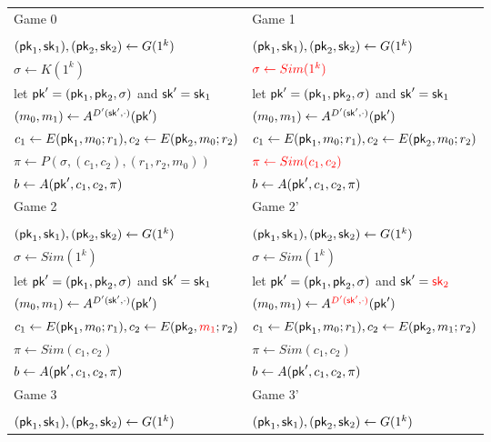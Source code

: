 \begin{table}[t!]
\centering
\begin{tabular}{l|l}
Game 0 &
Game 1 \\
 & \\
$(\mathsf{pk}_1,\mathsf{sk}_1),(\mathsf{pk}_2,\mathsf{sk}_2) \leftarrow G(1^k)$ &
$(\mathsf{pk}_1,\mathsf{sk}_1),(\mathsf{pk}_2,\mathsf{sk}_2) \leftarrow G(1^k)$ \\
$\sigma \leftarrow {K(1^k)}$ &
$\textcolor{red}{\sigma \leftarrow {Sim(1^k)}}$ \\
let $\mathsf{pk}'=(\mathsf{pk}_1,\mathsf{pk}_2,\sigma)$ and $\mathsf{sk}'={\mathsf{sk}_1}$ &
let $\mathsf{pk}'=(\mathsf{pk}_1,\mathsf{pk}_2,\sigma)$ and $\mathsf{sk}'={\mathsf{sk}_1}$ \\
$(m_0,m_1) \leftarrow A^{D'(\mathsf{sk}',\cdot)}(\mathsf{pk}')$ &
$(m_0,m_1) \leftarrow A^{D'(\mathsf{sk}',\cdot)}(\mathsf{pk}')$ \\
$c_1 \leftarrow E(\mathsf{pk}_1,{m_0};r_1), c_2 \leftarrow E(\mathsf{pk}_2,{m_0};r_2)$ &
$c_1 \leftarrow E(\mathsf{pk}_1,{m_0};r_1), c_2 \leftarrow E(\mathsf{pk}_2,{m_0};r_2)$ \\
$\pi \leftarrow {P(\sigma,(c_1,c_2),(r_1,r_2,{m_0}))}$ &
$\textcolor{red}{\pi \leftarrow {Sim(c_1,c_2)}}$ \\
$b \leftarrow A(\mathsf{pk}',c_1,c_2,\pi)$ &
$b \leftarrow A(\mathsf{pk}',c_1,c_2,\pi)$ \\
\hline
Game 2 &
Game 2' \\
 & \\
$(\mathsf{pk}_1,\mathsf{sk}_1),(\mathsf{pk}_2,\mathsf{sk}_2) \leftarrow G(1^k)$ &
$(\mathsf{pk}_1,\mathsf{sk}_1),(\mathsf{pk}_2,\mathsf{sk}_2) \leftarrow G(1^k)$ \\
$\sigma \leftarrow {Sim(1^k)}$ &
$\sigma \leftarrow {Sim(1^k)}$ \\
let $\mathsf{pk}'=(\mathsf{pk}_1,\mathsf{pk}_2,\sigma)$ and $\mathsf{sk}'={\mathsf{sk}_1}$  &
let $\mathsf{pk}'=(\mathsf{pk}_1,\mathsf{pk}_2,\sigma)$ and $\mathsf{sk}'=\textcolor{red}{\mathsf{sk}_2}$  \\
$(m_0,m_1) \leftarrow A^{D'(\mathsf{sk}',\cdot)}(\mathsf{pk}')$ &
$(m_0,m_1) \leftarrow A^{\textcolor{red}{D'(\mathsf{sk}',\cdot)}}(\mathsf{pk}')$ \\
$c_1 \leftarrow E(\mathsf{pk}_1,{m_0};r_1), c_2 \leftarrow E(\mathsf{pk}_2,\textcolor{red}{m_1};r_2)$ &
$c_1 \leftarrow E(\mathsf{pk}_1,{m_0};r_1), c_2 \leftarrow E(\mathsf{pk}_2,{m_1};r_2)$ \\
$\pi \leftarrow {Sim(c_1,c_2)}$ &
$\pi \leftarrow {Sim(c_1,c_2)}$ \\
$b \leftarrow A(\mathsf{pk}',c_1,c_2,\pi)$ &
$b \leftarrow A(\mathsf{pk}',c_1,c_2,\pi)$ \\
\hline
Game 3 &
Game 3' \\
 & \\
$(\mathsf{pk}_1,\mathsf{sk}_1),(\mathsf{pk}_2,\mathsf{sk}_2) \leftarrow G(1^k)$ &
$(\mathsf{pk}_1,\mathsf{sk}_1),(\mathsf{pk}_2,\mathsf{sk}_2) \leftarrow G(1^k)$ \\

\end{tabular}
\end{table}
